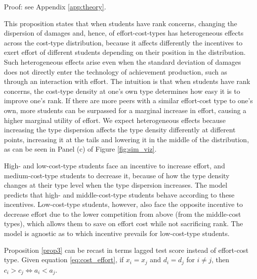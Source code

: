  Proof: see Appendix \ref{app:theory}.\par 
This proposition states that when students have rank concerns, changing the dispersion of damages and, hence, of effort-cost-types has heterogeneous effects across the cost-type distribution, because it affects differently the incentives to exert effort of different students depending on their position in the distribution. Such heterogeneous effects arise even when the standard deviation of damages does not directly enter the technology of achievement production, such as through an interaction with effort. The intuition is that when students have rank concerns, the cost-type density at one's own type determines how easy it is to improve one's rank. If there are more peers with a similar effort-cost type to one's own, more students can be surpassed for a marginal increase in effort, causing a higher marginal utility of effort. We expect heterogeneous effects because increasing the type dispersion affects the type density differently at different points, increasing it at the tails and lowering it in the middle of the distribution, as can be seen in Panel (c) of Figure \ref{fig:sim_viz}.\par
High- and low-cost-type students face an incentive to increase effort, and medium-cost-type students to decrease it, because of how the type density changes at their type level when the type dispersion increases. The model predicts that high- and middle-cost-type students behave according to these incentives. Low-cost-type students, however, also face the opposite incentive to decrease effort due to the lower competition from above (from the middle-cost types), which allows them to save on effort cost while not sacrificing rank. The model is agnostic as to which incentive prevails for low-cost-type students.\par 

\begin{lemma}\label{lemma}
Proposition \ref{prop3} can be recast in terms lagged test score instead of effort-cost type. Given equation \eqref{eq:cost_effort}, if $x_i=x_j$ and $d_i=d_j$ for $i\neq j$, then $c_i>c_j\iff a_i<a_j$.   
\end{lemma}




